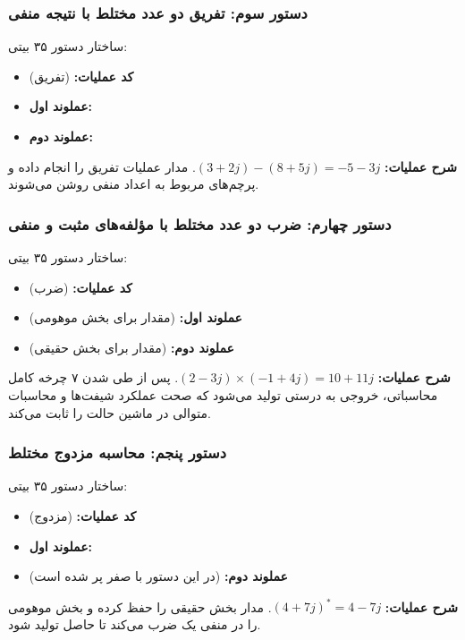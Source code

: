 \documentclass[11pt,a4paper]{article}
\begin{document}
\subsubsection{دستور سوم: تفریق دو عدد مختلط با نتیجه منفی}
ساختار دستور ۳۵ بیتی: 
\begin{itemize}
    \item \textbf{کد عملیات:}  (تفریق)
    \item \textbf{عملوند اول:} 
    \item \textbf{عملوند دوم:} 
\end{itemize}
\textbf{شرح عملیات:} $(3+2j) - (8+5j) = -5-3j$. مدار عملیات تفریق را انجام داده و پرچم‌های مربوط به اعداد منفی روشن می‌شوند.

\subsubsection{دستور چهارم: ضرب دو عدد مختلط با مؤلفه‌های مثبت و منفی}
ساختار دستور ۳۵ بیتی: 
\begin{itemize}
    \item \textbf{کد عملیات:}  (ضرب)
    \item \textbf{عملوند اول:}  (مقدار  برای بخش موهومی)
    \item \textbf{عملوند دوم:}  (مقدار  برای بخش حقیقی)
\end{itemize}
\textbf{شرح عملیات:} $(2-3j) \times (-1+4j) = 10+11j$. پس از طی شدن ۷ چرخه کامل محاسباتی، خروجی به درستی تولید می‌شود که صحت عملکرد شیفت‌ها و محاسبات متوالی در ماشین حالت را ثابت می‌کند.

\subsubsection{دستور پنجم: محاسبه مزدوج مختلط}
ساختار دستور ۳۵ بیتی: 
\begin{itemize}
    \item \textbf{کد عملیات:}  (مزدوج)
    \item \textbf{عملوند اول:} 
    \item \textbf{عملوند دوم:} (در این دستور با صفر پر شده است)
\end{itemize}
\textbf{شرح عملیات:} $(4+7j)^* = 4-7j$. مدار بخش حقیقی را حفظ کرده و بخش موهومی را در منفی یک ضرب می‌کند تا حاصل تولید شود.
\end{document}
